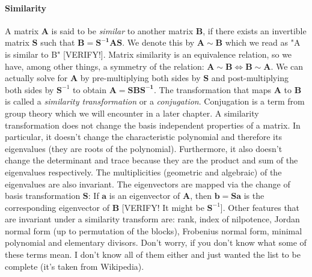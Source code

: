 \paragraph{Similarity}
A matrix $\mathbf{A}$ is said to be \emph{similar} to another matrix $\mathbf{B}$, if there exists an invertible matrix $\mathbf{S}$ such that $\mathbf{B} = \mathbf{S^{-1} A S}$. We denote this by $\mathbf{A} \sim \mathbf{B}$ which we read as "A is similar to B" [VERIFY!]. Matrix similarity is an equivalence relation, so we have, among other things, a symmetry of the relation: $\mathbf{A} \sim \mathbf{B} \Leftrightarrow \mathbf{B} \sim \mathbf{A}$. We can actually solve for $\mathbf{A}$ by pre-multiplying both sides by $\mathbf{S}$ and post-multiplying both sides by $\mathbf{S}^{-1}$ to obtain $\mathbf{A} = \mathbf{S B S^{-1}}$. The transformation that maps $\mathbf{A}$ to $\mathbf{B}$ is called a \emph{similarity transformation} or a \emph{conjugation}. Conjugation is a term from group theory which we will encounter in a later chapter. A similarity transformation does not change the basis independent properties of a matrix. In particular, it doesn't change the characteristic polynomial and therefore its eigenvalues (they are roots of the polynomial). Furthermore, it also doesn't change the determinant and trace because they are the product and sum of the eigenvalues respectively. The multiplicities (geometric and algebraic) of the eigenvalues are also invariant. The eigenvectors are mapped via the change of basis transformation $\mathbf{S}$: If $\mathbf{a}$ is an eigenvector of  $\mathbf{A}$, then $\mathbf{b} = \mathbf{S a}$ is the corresponding eigenvector of $\mathbf{B}$ [VERIFY! It might be $\mathbf{S}^{-1}$]. Other features that are invariant under a similarity transform are: rank, index of nilpotence, Jordan normal form (up to permutation of the blocks), Frobenius normal form, minimal polynomial and elementary divisors. Don't worry, if you don't know what some of these terms mean. I don't know all of them either and just wanted the list to be complete (it's taken from Wikipedia).







